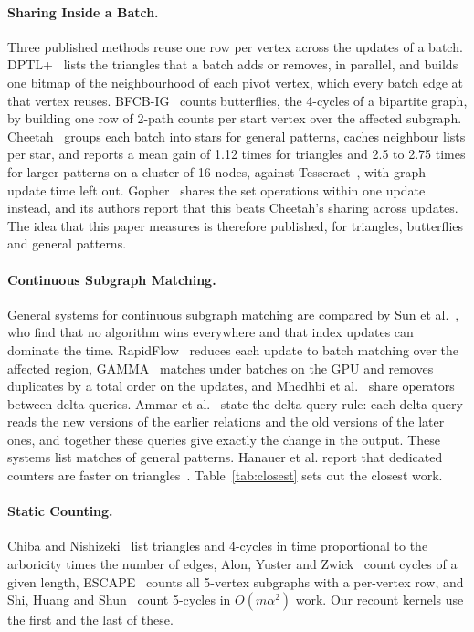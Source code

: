 \paragraph{Sharing Inside a Batch.}
Three published methods reuse one row per vertex across the updates of a batch.
DPTL+~\cite{dptl} lists the triangles that a batch adds or removes, in parallel, and builds one bitmap of the neighbourhood of each pivot vertex, which every batch edge at that vertex reuses.
BFCB-IG~\cite{bfcb} counts butterflies, the 4-cycles of a bipartite graph, by building one row of 2-path counts per start vertex over the affected subgraph.
Cheetah~\cite{cheetah} groups each batch into stars for general patterns, caches neighbour lists per star, and reports a mean gain of 1.12 times for triangles and 2.5 to 2.75 times for larger patterns on a cluster of 16 nodes, against Tesseract~\cite{tesseract}, with graph-update time left out.
Gopher~\cite{gopher} shares the set operations within one update instead, and its authors report that this beats Cheetah's sharing across updates.
The idea that this paper measures is therefore published, for triangles, butterflies and general patterns.

\paragraph{Continuous Subgraph Matching.}
General systems for continuous subgraph matching are compared by Sun et al.~\cite{sun-csm-study}, who find that no algorithm wins everywhere and that index updates can dominate the time.
RapidFlow~\cite{rapidflow} reduces each update to batch matching over the affected region, GAMMA~\cite{gamma} matches under batches on the GPU and removes duplicates by a total order on the updates, and Mhedhbi et al.~\cite{mhedhbi-tods} share operators between delta queries.
Ammar et al.~\cite{ammar-delta} state the delta-query rule: each delta query reads the new versions of the earlier relations and the old versions of the later ones, and together these queries give exactly the change in the output.
These systems list matches of general patterns. Hanauer et al. report that dedicated counters are faster on triangles~\cite{hanauer-dyncount}. Table~\ref{tab:closest} sets out the closest work.

\paragraph{Static Counting.}
Chiba and Nishizeki~\cite{chiba-nishizeki} list triangles and 4-cycles in time proportional to the arboricity times the number of edges, Alon, Yuster and Zwick~\cite{alon-yuster-zwick} count cycles of a given length, ESCAPE~\cite{escape} counts all 5-vertex subgraphs with a per-vertex row, and Shi, Huang and Shun~\cite{shi-huang-shun} count 5-cycles in $O(m\alpha^2)$ work.
Our recount kernels use the first and the last of these.

